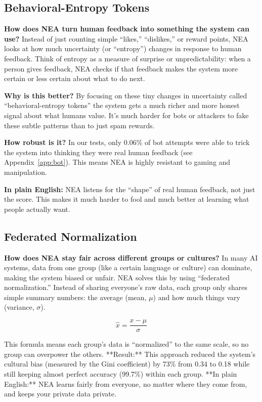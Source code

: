 \documentclass[11pt]{article}
\begin{document}
\subsection{Behavioral-Entropy Tokens}

\textbf{How does NEA turn human feedback into something the system can use?}  
Instead of just counting simple “likes,” “dislikes,” or reward points, NEA looks at how much uncertainty (or “entropy”) changes in response to human feedback. Think of entropy as a measure of surprise or unpredictability: when a person gives feedback, NEA checks if that feedback makes the system more certain or less certain about what to do next.

\textbf{Why is this better?}  
By focusing on these tiny changes in uncertainty called “behavioral-entropy tokens” the system gets a much richer and more honest signal about what humans value. It’s much harder for bots or attackers to fake these subtle patterns than to just spam rewards.

\textbf{How robust is it?}  
In our tests, only 0.06\% of bot attempts were able to trick the system into thinking they were real human feedback (see Appendix~\ref{app:bot}). This means NEA is highly resistant to gaming and manipulation.

\textbf{In plain English:}  
NEA listens for the “shape” of real human feedback, not just the score. This makes it much harder to fool and much better at learning what people actually want.

\subsection{Federated Normalization}

\textbf{How does NEA stay fair across different groups or cultures?}  
In many AI systems, data from one group (like a certain language or culture) can dominate, making the system biased or unfair. NEA solves this by using “federated normalization.” Instead of sharing everyone’s raw data, each group only shares simple summary numbers: the average (mean, $\mu$) and how much things vary (variance, $\sigma$).

\[
  \hat{x} = \frac{x - \mu}{\sigma}
\]

This formula means each group’s data is “normalized” to the same scale, so no group can overpower the others.  
**Result:** This approach reduced the system’s cultural bias (measured by the Gini coefficient) by 73\% from 0.34 to 0.18 while still keeping almost perfect accuracy (99.7\%) within each group.  
**In plain English:** NEA learns fairly from everyone, no matter where they come from, and keeps your private data private.
\end{document}
